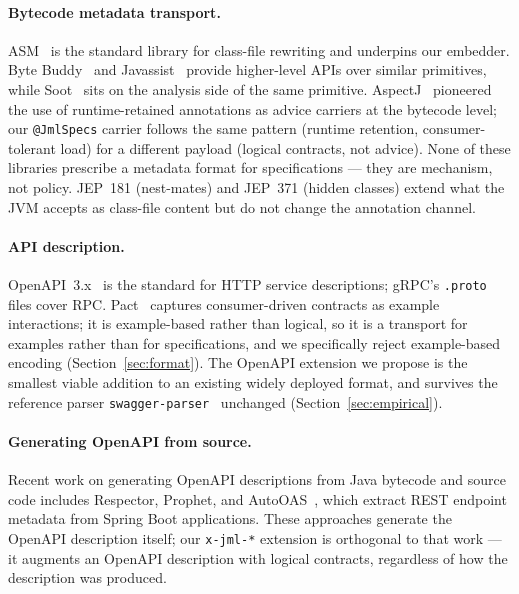 \paragraph{Bytecode metadata transport.}
ASM~\cite{asm} is the standard library for class-file rewriting and underpins our embedder. Byte Buddy~\cite{bytebuddy} and Javassist~\cite{chiba2000javassist} provide higher-level APIs over similar primitives, while Soot~\cite{vallee1999soot} sits on the analysis side of the same primitive. AspectJ~\cite{kiczales1997aspectj} pioneered the use of runtime-retained annotations as advice carriers at the bytecode level; our \texttt{@JmlSpecs} carrier follows the same pattern (runtime retention, consumer-tolerant load) for a different payload (logical contracts, not advice). None of these libraries prescribe a metadata format for specifications --- they are mechanism, not policy. JEP~181 (nest-mates) and JEP~371 (hidden classes) extend what the JVM accepts as class-file content but do not change the annotation channel.

\paragraph{API description.}
OpenAPI~3.x~\cite{openapi3} is the standard for HTTP service descriptions; gRPC's \texttt{.proto} files cover RPC. Pact~\cite{pact} captures consumer-driven contracts as example interactions; it is example-based rather than logical, so it is a transport for examples rather than for specifications, and we specifically reject example-based encoding (Section~\ref{sec:format}). The OpenAPI extension we propose is the smallest viable addition to an existing widely deployed format, and survives the reference parser \texttt{swagger-parser}~\cite{swaggerparser} unchanged (Section~\ref{sec:empirical}).

\paragraph{Generating OpenAPI from source.}
Recent work on generating OpenAPI descriptions from Java bytecode and source code includes Respector, Prophet, and AutoOAS~\cite{Lercher2024-AutoOAS}, which extract REST endpoint metadata from Spring Boot applications. These approaches generate the OpenAPI description itself; our \texttt{x-jml-*} extension is orthogonal to that work --- it augments an OpenAPI description with logical contracts, regardless of how the description was produced.

